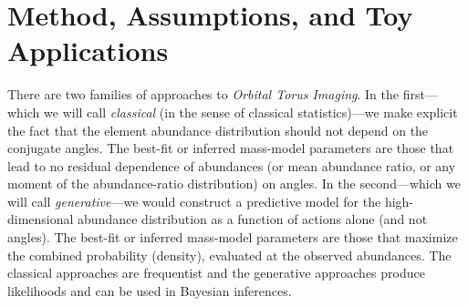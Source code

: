 \documentclass[modern]{aastex63}
\newcommand{\methodname}{\textsl{Orbital Torus Imaging}}
\begin{document}
\section{Method, Assumptions, and Toy Applications}
\label{sec:inferences}

There are two families of approaches to \methodname.
In the first---which we will call \emph{classical} (in the sense of classical
statistics)---we make explicit the fact that the element abundance distribution
should not depend on the conjugate angles.
The best-fit or inferred mass-model parameters are those that lead to no
residual dependence of abundances (or mean abundance ratio, or any moment of the
abundance-ratio distribution) on angles.
In the second---which we will call \emph{generative}---we would construct a
predictive model for the high-dimensional abundance distribution as a function
of actions alone (and not angles).
The best-fit or inferred mass-model parameters are those that maximize the
combined probability (density), evaluated at the observed abundances.
The classical approaches are frequentist and the generative approaches produce
likelihoods and can be used in Bayesian inferences.
\end{document}
